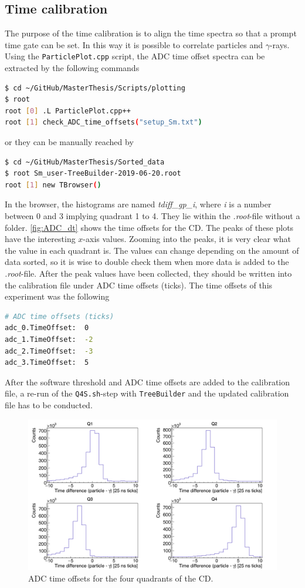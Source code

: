 \documentclass[twoside,english]{uiofysmaster/uiofysmaster}
\newcommand{\ga}{$\gamma$}
\let\orgautoref\autoref
\renewcommand{\autoref}
        {%
		 \def\sectionautorefname{Section}%
		 \def\subsectionautorefname{Section}%
		 \def\subsubsectionautorefname{Section}%
		 \def\chapterautorefname{Chapter}%
          \orgautoref}
\begin{document}
\subsection{Time calibration}\label{ssec:time_cal}
The purpose of the time calibration is to align the time spectra so that a prompt time gate can be set. In this way it is possible to correlate particles and \ga-rays. Using the \texttt{ParticlePlot.cpp} script, the ADC time offset spectra can be extracted by the following commands
\begin{lstlisting}[language=sh]
$ cd ~/GitHub/MasterThesis/Scripts/plotting
$ root
root [0] .L ParticlePlot.cpp++
root [1] check_ADC_time_offsets("setup_Sm.txt")
\end{lstlisting}
or they can be manually reached by
\begin{lstlisting}[language=sh]
$ cd ~/GitHub/MasterThesis/Sorted_data
$ root Sm_user-TreeBuilder-2019-06-20.root
root [1] new TBrowser()
\end{lstlisting}
In the browser, the histograms are named \textit{tdiff\_gp\_i}, where \textit{i} is a number between 0 and 3 implying quadrant 1 to 4. 
They lie within the \textit{.root}-file without a folder. \autoref{fig:ADC_dt} shows the time offsets for the CD. 
The peaks of these plots have the interesting $x$-axis values. 
Zooming into the peaks, it is very clear what the value in each quadrant is. 
The values can change depending on the amount of data sorted, so it is wise to double check them when more data is added to the \textit{.root}-file. 
After the peak values have been collected, they should be written into the calibration file under ADC time offsets (ticks). 
The time offsets of this experiment was the following
\begin{lstlisting}[language=sh]
# ADC time offsets (ticks)
adc_0.TimeOffset:  0
adc_1.TimeOffset:  -2
adc_2.TimeOffset:  -3
adc_3.TimeOffset:  5
\end{lstlisting}
After the software threshold and ADC time offsets are added to the calibration file, a re-run of the \texttt{Q4S.sh}-step with \texttt{TreeBuilder} and the updated calibration file has to be conducted.

\begin{figure}[ht]
	\centering
	\includegraphics[width=\textwidth]{../Plots/plotting/tdiff_gp_0-3-user.png}
	\caption{ADC time offsets for the four quadrants of the CD.}
	\label{fig:ADC_dt}
\end{figure}
\end{document}
